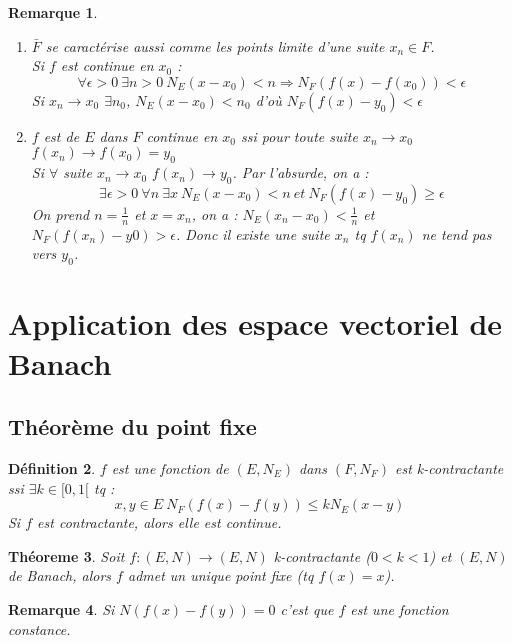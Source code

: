 \documentclass[a4paper, oneside]{report}
\theoremstyle{break}
\newtheorem{thm}{Théoreme}[section] %
\newtheorem{defi}[thm]{Définition}
\newtheorem{remar}[thm]{Remarque}
\newcommand{\ev}{espace vectoriel }
\newcommand{\fracun}[1]{\frac{1}{#1}}
\begin{document}
\begin{remar}
\begin{enumerate}
\item $\bar{F}$ se caractérise aussi comme les points limite d'une suite $x_n\in F$.\\

Si $f$ est continue en $x_0$ :
$$\forall \epsilon >0~\exists n>0~N_E(x-x_0)<n\Rightarrow N_F(f(x)-f(x_0)) < \epsilon$$
Si $x_n\rightarrow x_0$ $\exists n_0$, $N_E(x-x_0)<n_0$ d'où $N_F(f(x)-y_0) < \epsilon$

\item $f$ est de $E$ dans $F$ continue en $x_0$ ssi pour toute suite $x_n\rightarrow x_0$ $f(x_n)\rightarrow f(x_0)=y_0$\\

Si $\forall$ suite $x_n\rightarrow x_0$ $f(x_n)\rightarrow y_0$. Par l'absurde, on a :
$$\exists \epsilon >0~\forall n~\exists x~ N_E(x-x_0)<n~et~N_F(f(x)-y_0)\geq \epsilon$$
On prend $n=\fracun{n}$ et $x=x_n$, on a : $N_E(x_n-x_0)<\fracun{n}$ et $N_F(f(x_n)-y0)>\epsilon$. Donc il existe une suite $x_n$ tq $f(x_n)$ ne tend pas vers $y_0$.

\end{enumerate}
\end{remar}


\section{Application des \ev de Banach}

\subsection{Théorème du point fixe}

\begin{defi}                    
$f$ est une fonction de $(E,N_E)$ dans $(F,N_F)$ est k-contractante ssi $\exists k\in [0,1[$ tq :
$$x,y\in E~N_F(f(x)-f(y))\leq kN_E(x-y)$$
Si $f$ est contractante, alors elle est continue.
\end{defi}

\begin{thm}
Soit $f:(E,N) \rightarrow (E,N)$ k-contractante ($0< k<1$) et $(E,N)$ de Banach, alors $f$ admet un unique point fixe (tq $f(x)=x$).
\end{thm}



\begin{remar}
Si $N(f(x)-f(y))=0$ c'est que $f$ est une fonction constance.
\end{remar}
\end{document}
